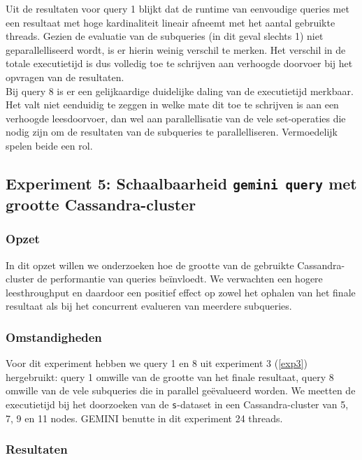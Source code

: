 Uit de resultaten voor query 1 blijkt dat de runtime van eenvoudige queries met een resultaat met hoge kardinaliteit lineair afneemt met het aantal gebruikte threads. Gezien de evaluatie van de subqueries (in dit geval slechts 1) niet geparallelliseerd wordt, is er hierin weinig verschil te merken. Het verschil in de totale executietijd is dus volledig toe te schrijven aan verhoogde doorvoer bij het opvragen van de resultaten.\\
Bij query 8 is er een gelijkaardige duidelijke daling van de executietijd merkbaar. Het valt niet eenduidig te zeggen in welke mate dit toe te schrijven is aan een verhoogde leesdoorvoer, dan wel aan parallellisatie van de vele set-operaties die nodig zijn om de resultaten van de subqueries te parallelliseren. Vermoedelijk spelen beide een rol.

\subsection{Experiment 5: Schaalbaarheid \texttt{gemini query} met grootte Cassandra-cluster}
\label{exp5}

\subsubsection{Opzet}

In dit opzet willen we onderzoeken hoe de grootte van de gebruikte Cassandra-cluster de performantie van queries be\"invloedt. We verwachten een hogere leesthroughput en daardoor een positief effect op zowel het ophalen van het finale resultaat als bij het concurrent evalueren van meerdere subqueries.

\subsubsection{Omstandigheden}

Voor dit experiment hebben we query 1 en 8 uit experiment 3 (\ref{exp3}) hergebruikt: query 1 omwille van de grootte van het finale resultaat, query 8 omwille van de vele subqueries die in parallel ge\"evalueerd worden. We meetten de executietijd bij het doorzoeken van de \texttt{s}-dataset in een Cassandra-cluster van 5, 7, 9 en 11 nodes. GEMINI benutte in dit experiment 24 threads.

\subsubsection{Resultaten}

